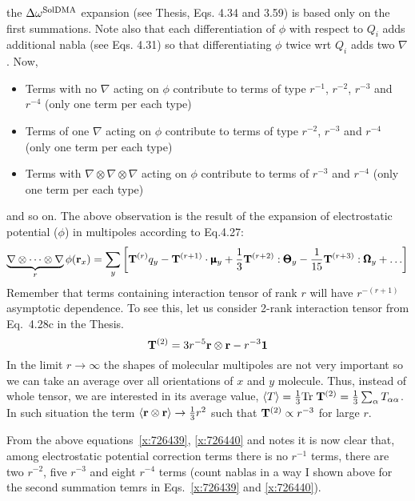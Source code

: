 \documentclass{exam}
\begin{document}
\begin{questions}
\begin{solution}
the $\Delta\omega^{\rm SolDMA}$ expansion (see Thesis, Eqs. 4.34 and 3.59) is based only on the first summations.
Note also that each differentiation of $\phi$ with respect to $Q_i$ adds additional nabla (see Eqs. 4.31)
so that differentiating $\phi$ twice wrt $Q_i$ adds two $\nabla$. Now, 
\begin{itemize}
 \item Terms with no $\nabla$ acting on $\phi$ 
 contribute to terms of type $r^{-1}$, $r^{-2}$, $r^{-3}$ and $r^{-4}$ (only one term per each type)
 \item Terms of one $\nabla$ acting on $\phi$ 
 contribute to terms of type $r^{-2}$, $r^{-3}$ and $r^{-4}$ (only one term per each type)
 \item Terms with $\nabla\otimes\nabla\otimes\nabla$ acting on $\phi$ 
 contribute to terms of $r^{-3}$ and $r^{-4}$ (only one term per each type)
\end{itemize}
and so on. The above observation is the result of the expansion of electrostatic potential ($\phi$) in multipoles
according to Eq.4.27:
%
\begin{equation} \label{e:potential-gradients}
\underbrace{\nabla \otimes \cdots \otimes \nabla}_{r} \phi({\bf r}_x) = 
\sum_y \left[ 
{\bf T}^{(r)} q_y - {\bf T}^{(r+1)} \cdot \pmb{\upmu}_y + 
 \frac{1}{3} {\bf T}^{(r+2)} : \pmb{\Theta}_y - 
\frac{1}{15} {\bf T}^{(r+3)} : \pmb{\Omega}_y + \ldots
\right]
\end{equation}
%
Remember that terms containing interaction tensor of rank $r$ will have $r^{-(r+1)}$
asymptotic dependence. To see this, let us consider 2-rank interaction tensor 
from Eq.~4.28c in the Thesis. 
%
\begin{equation}
 {\bf T}^{(2)} = 3 r^{-5} {\bf r} \otimes {\bf r} - r^{-3}{\bf 1}
\end{equation}
%
In the limit $r\rightarrow\infty$ the shapes of molecular multipoles
are not very important so we can take an average over all orientations
of $x$ and $y$ molecule.
Thus, instead of whole tensor, we are interested in its average value, 
$\langle T\rangle=\frac{1}{3}{\rm Tr}\;{\bf T}^{(2)} = \frac{1}{3} \sum_\alpha T_{\alpha\alpha}$.
In such situation
the term $\langle {\bf r} \otimes {\bf r} \rangle \rightarrow \frac{1}{3} r^2$
such that ${\bf T}^{(2)}\propto r^{-3}$ for large $r$.

From the above equations~\eqref{x:726439}, \eqref{x:726440} and notes 
it is now clear that, among electrostatic potential correction terms 
there is no $r^{-1}$ terms, there are two $r^{-2}$, five $r^{-3}$ and eight $r^{-4}$ terms (count nablas
in a way I shown above for the second summation temrs in Eqs.~\eqref{x:726439} and \eqref{x:726440}). 


\end{solution}
\end{questions}
\end{document}
